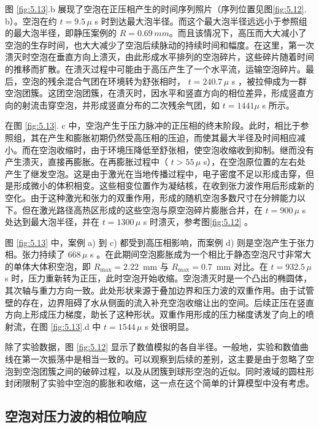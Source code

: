 图 \ref{fig:5.13}.b 展现了空泡在正压相产生的时间序列照片（序列位置见图\ref{fig:5.12}.
b）。空泡在约 $t=9.5\,\mu$ s
时到达最大泡半径。而这个最大泡半径远远小于参照组的最大泡半径，即静压案例的
$R=0.69\,mm$。而且该情况下，高压而大大减小了空泡的生存时间，也大大减少了空泡后续脉动的持续时间和幅度。在这里，第一次溃灭时空泡在垂直方向上溃灭，由此形成水平排列的空泡碎片，这些碎片随着时间的推移而扩散。在溃灭过程中可能由于高压产生了一个水平流，运输空泡碎片。最后，空泡的残余混合气团在环境转为舒张相时，
$t=240.7\,\mu$ s
，被拉伸成为一群空泡团簇。这团空泡团簇，在溃灭时，因水平和竖直方向的相位差异，形成竖直方向的射流击穿空泡，并形成竖直分布的二次残余气团，如
$t=1441\mu$ s 所示。

在图 \ref{fig:5.13}. c
中，空泡产生于压力脉冲的正压相的终末阶段。此时，相比于参照组，其在产生和膨胀初期仍然受高压相的压迫，而使其最大半径及时间相应减小。而在空泡收缩时，由于环境压降低至舒张相，使空泡收缩收到抑制。继而没有产生溃灭，直接再膨胀。在再膨胀过程中（
$t>55\,\mu$
s），在空泡原位置的左右处产生了继发空泡。这是由于激光在当地传播过程中，电子密度不足以形成击穿，但是形成微小的体积相变。这些相变位置作为凝结核，在收到张力波作用后形成新的空化。由于这种激光和张力的双重作用，形成的随机空泡多数尺寸在分辨能力以下。但在激光路径高热区形成的这些空泡与原空泡碎片膨胀合并，在
$t=900\,\mu$ s 处达到最大泡半径，并在 $t=1300\,\mu$ s 时溃灭，参考图\ref{fig:5.12}
。

图 \ref{fig:5.13} 中，案例 a) 到 c) 都受到高压相影响，而案例 d)
则是空泡产生于张力相。张力持续了 $668\,\mu$ s
。在此期间空泡膨胀成为一个相比于静态空泡尺寸非常大的单体大体积空泡，即
$R_\mathrm{max}=2.22\,$ mm 与 $R_\mathrm{max}=0.7\,$ mm 对比。在
$t=932.5\,\mu$ s
时，压力重新转为正压，此时空泡开始收缩。空泡溃灭时是一个凸出的椭圆体，其次轴与重力方向一致。此处形状来源于叠加边界和压力波的双重作用。由于试管壁的存在，边界阻碍了水从侧面的流入补充空泡收缩让出的空间。后续正压在竖直方向上形成压力梯度，助长了这种形状。双重作用形成的压力梯度诱发了向上的喷射流，在图
\ref{fig:5.13}.d 中 $t=1544\,\mu$ s 处很明显。

除了实验数据，图 \ref{fig:5.12}
显示了数值模拟的各自半径。一般地，实验和数值曲线在第一次振荡中是相当一致的。可以观察到后续的差别，这主要是由于忽略了空泡到空泡团簇之间的破碎过程，以及从团簇到球形空泡的近似。同时液域的圆柱形封闭限制了实验中空泡的膨胀和收缩，这一点在这个简单的计算模型中没有考虑。


\subsection{空泡对压力波的相位响应}

